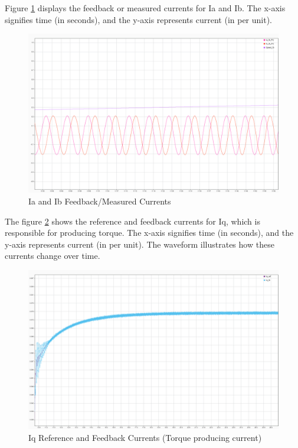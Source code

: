 Figure \ref{fig:current_response_IA_IB} displays the feedback or measured currents for Ia and Ib. The x-axis signifies time (in seconds), and the y-axis represents current (in per unit).

\begin{figure}
	\centering
	\includegraphics[width=5in]{sections/section3/images/simulationResutls/Ia_Ib_fb.png}
	\caption{Ia and Ib Feedback/Measured Currents}
	\label{fig:current_response_IA_IB}
\end{figure}



The figure \ref{fig:current_response_Iq_ref_fb} shows the reference and feedback currents for Iq, which is responsible for producing torque. The x-axis signifies time (in seconds), and the y-axis represents current (in per unit). The waveform illustrates how these currents change over time. 

\begin{figure}
	\centering
	\includegraphics[width=5in]{sections/section3/images/simulationResutls/Iq_ref_fb.png}
	\caption{Iq Reference and Feedback Currents (Torque producing current)}
	\label{fig:current_response_Iq_ref_fb}
\end{figure}


